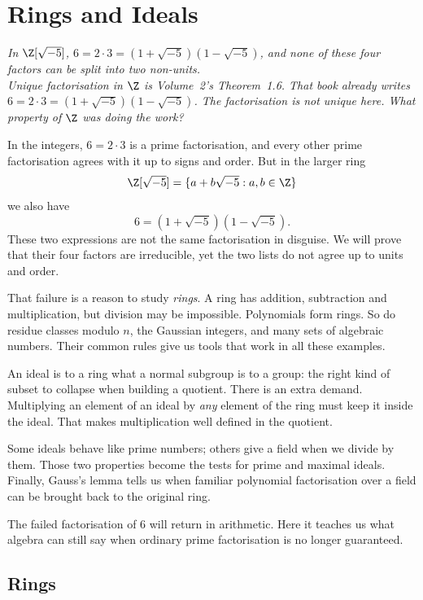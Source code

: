 \chapter{Rings and Ideals}

\begin{center}\itshape
In $\Z[\sqrt{-5}]$, $6=2\cdot3=(1+\sqrt{-5})(1-\sqrt{-5})$, and none of these four factors can be split into two non-units.\\
Unique factorisation in $\Z$ is Volume~2's Theorem~1.6. That book already writes $6=2\cdot3=(1+\sqrt{-5})(1-\sqrt{-5})$. The factorisation is not unique here. What property of $\Z$ was doing the work?
\end{center}

In the integers, $6=2\cdot3$ is a prime factorisation, and every other prime factorisation agrees with it up to signs and order. But in the larger ring
\[
\Z[\sqrt{-5}]=\{a+b\sqrt{-5}:a,b\in\Z\}
\]
we also have
\[
6=(1+\sqrt{-5})(1-\sqrt{-5}).
\]
These two expressions are not the same factorisation in disguise. We will prove that their four factors are irreducible, yet the two lists do not agree up to units and order.

That failure is a reason to study \emph{rings}. A ring has addition, subtraction and multiplication, but division may be impossible. Polynomials form rings. So do residue classes modulo $n$, the Gaussian integers, and many sets of algebraic numbers. Their common rules give us tools that work in all these examples.

An ideal is to a ring what a normal subgroup is to a group: the right kind of subset to collapse when building a quotient. There is an extra demand. Multiplying an element of an ideal by \emph{any} element of the ring must keep it inside the ideal. That makes multiplication well defined in the quotient.

Some ideals behave like prime numbers; others give a field when we divide by them. Those two properties become the tests for prime and maximal ideals. Finally, Gauss's lemma tells us when familiar polynomial factorisation over a field can be brought back to the original ring.

The failed factorisation of $6$ will return in arithmetic. Here it teaches us what algebra can still say when ordinary prime factorisation is no longer guaranteed.

\section{Rings}

